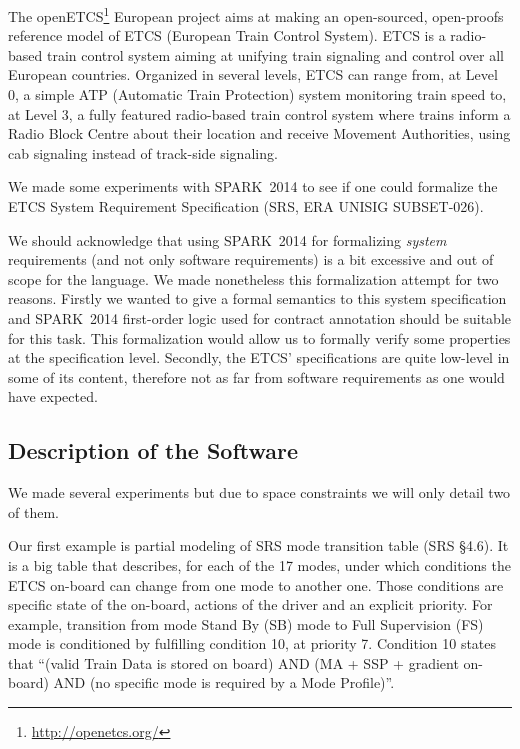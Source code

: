 \documentclass[10pt,a4paper,twocolumn]{article}
\newcommand{\newspark}{SPARK~2014\xspace}
\begin{document}

The openETCS\footnote{\url{http://openetcs.org/}} European project
aims at making an open-sourced, open-proofs reference model of ETCS
(European Train Control System). ETCS is a radio-based train control
system aiming at unifying train signaling and control over all
European countries. Organized in several levels, ETCS can range from,
at Level 0, a simple ATP (Automatic Train Protection) system
monitoring train speed to, at Level 3, a fully featured radio-based
train control system where trains inform a Radio Block Centre about
their location and receive Movement Authorities, using cab signaling
instead of track-side signaling.

We made some experiments with \newspark to see if one could formalize
the ETCS System Requirement Specification (SRS, ERA UNISIG
SUBSET-026).

We should acknowledge that using \newspark for formalizing
\emph{system} requirements (and not only software requirements) is a
bit excessive and out of scope for the language. We made nonetheless
this formalization attempt for two reasons. Firstly we wanted to give
a formal semantics to this system specification and \newspark
first-order logic used for contract annotation should be suitable for
this task. This formalization would allow us to formally verify some
properties at the specification level.  Secondly, the ETCS'
specifications are quite low-level in some of its content, therefore
not as far from software requirements as one would have expected.

\subsection{Description of the Software}

We made several experiments but due to space constraints we will only
detail two of them.

Our first example is partial modeling of SRS mode transition table
(SRS §4.6). It is a big table that describes, for each of the 17
modes, under which conditions the ETCS on-board can change from one
mode to another one. Those conditions are specific state of the
on-board, actions of the driver and an explicit priority. For example,
transition from mode Stand By (SB) mode to Full Supervision (FS) mode
is conditioned by fulfilling condition 10, at priority 7. Condition 10
states that ``(valid Train Data is stored on board) AND (MA + SSP +
gradient on-board) AND (no specific mode is required by a Mode
Profile)''.
\end{document}
